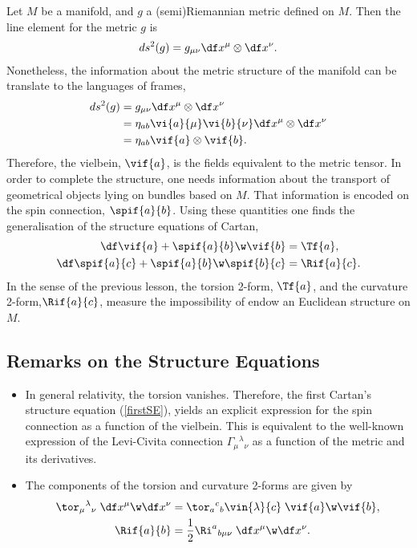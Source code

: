 Let $M$ be a manifold, and $g$ a (semi)Riemannian metric defined on $M$. Then the line element for the metric $g$ is
\begin{align}
  ds^2(g) = g_{\mu\nu}\df x^\mu \otimes\df x^\nu.
\end{align}
Nonetheless, the information about the metric structure of the manifold can be translate to the languages of frames,
\begin{align}
  ds^2(g) &= g_{\mu\nu}\df x^\mu \otimes\df x^\nu\\
  &= \eta_{ab} \vi{a}{\mu}\vi{b}{\nu}\df x^\mu \otimes\df x^\nu\\
  &=\eta_{ab}\vif{a}\otimes\vif{b}.
\end{align}
Therefore, the vielbein, $\vif{a}$, is the fields equivalent to the metric tensor. In order to complete the structure, one needs information about the transport of geometrical objects lying on bundles based on $M$. That information is encoded on the spin connection, $\spif{a}{b}$. Using these quantities one finds  the generalisation of the structure equations of Cartan,
\begin{align}
  \df\vif{a} +\spif{a}{b}\w\vif{b} &= \Tf{a},\label{firstSE}\\
  \df\spif{a}{c}+\spif{a}{b}\w\spif{b}{c} &= \Rif{a}{c}\label{secondSE}.
\end{align}
In the sense of the previous lesson, the torsion 2-form, $\Tf{a}$, and the curvature 2-form,$\Rif{a}{c}$, measure the impossibility of endow an Euclidean structure on $M$.

\subsection*{Remarks on the Structure Equations}

\begin{itemize}
\item In general relativity, the torsion vanishes. Therefore, the first Cartan's structure equation (\ref{firstSE}), yields an explicit expression for the spin connection as a function of the vielbein. This is equivalent to the well-known expression of the Levi-Civita connection $\Gamma_\mu{}^\lambda{}_\nu$ as a function of the metric and its derivatives.
\item The components of the torsion and curvature 2-forms are given by
  \begin{align}
    \tor_\mu{}^\lambda{}_\nu \;\df x^\mu\w\df x^\nu &= \tor_a{}^c{}_b \vin{\lambda}{c}\;\vif{a}\w\vif{b},\\
    \Rif{a}{b} &= \frac{1}{2}\Ri^a{}_{b\mu\nu}\;\df x^\mu\w\df x^\nu.\label{def-curv-comp}
  \end{align}
\end{itemize}

